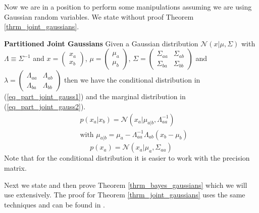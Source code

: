 \documentclass[../masters.tex]{subfiles}
\begin{document}
Now we are in a position to perform some manipulations assuming we are using Gaussian random variables. We state without proof Theorem \ref{thrm_joint_gaussians}.
\begin{thrm}
\textbf{Partitioned Joint Gaussians}
Given a Gaussian distribution $\mathcal{N}(x|\mu,\Sigma)$ with $\Lambda \equiv \Sigma^{-1}$ and $x=\begin{pmatrix}
x_a \\ x_b
\end{pmatrix}$, $\mu=\begin{pmatrix}
\mu_a \\ \mu_b
\end{pmatrix}$, $\Sigma=\begin{pmatrix}
\Sigma_{aa} & \Sigma_{ab} \\ \Sigma_{ba} & \Sigma_{bb}
\end{pmatrix}$ and $\lambda = \begin{pmatrix}
\Lambda_{aa} & \Lambda_{ab} \\ \Lambda_{ba} & \Lambda_{bb}
\end{pmatrix}$ then we have the conditional distribution in (\ref{eq_part_joint_gauss1}) and the marginal distribution in (\ref{eq_part_joint_gauss2}).
\begin{equation}
\begin{aligned}
&p(x_a|x_b) = \mathcal{N}(x_a|\mu_{a|b}, \Lambda_{aa}^{-1}) \\
&\text{with } \mu_{a|b} = \mu_a - \Lambda_{aa}^{-1}\Lambda_{ab}(x_b-\mu_b)
\end{aligned}
\label{eq_part_joint_gauss1}
\end{equation}
\begin{equation}
p(x_a) = \mathcal{N}(x_a|\mu_a,\Sigma_{aa})
\label{eq_part_joint_gauss2}
\end{equation}
\label{thrm_joint_gaussians}
Note that for the conditional distribution it is easier to work with the precision matrix. 
\end{thrm}
Next we state and then prove Theorem \ref{thrm_bayes_gaussians} which we will use extensively. The proof for Theorem \ref{thrm_joint_gaussians} uses the same techniques and can be found in \cite{bishop}.
\end{document}
